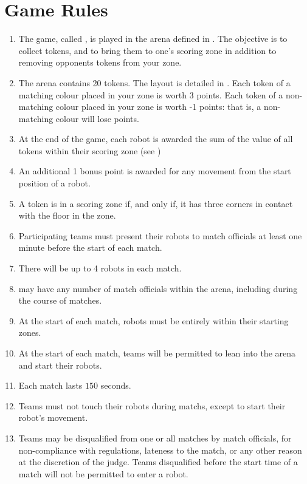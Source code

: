\section{Game Rules}
\label{sec:rules}

\begin{enumerate}
  \item The game, called \emph{\gamename}, is played in the arena defined in
        . The objective is to collect tokens, and to bring
        them to one's scoring zone in addition to removing opponents tokens from
        your zone.
  \item The arena contains 20 tokens. The layout is detailed in
        . Each token of a matching colour placed in your
        zone is worth 3 points. Each token of a non-matching colour placed in
        your zone is worth -1 points: that is, a non-matching colour will lose
        points.
  \item At the end of the game, each robot is awarded the sum of the value of
        all tokens within their scoring zone (see )
  \item An additional 1 bonus point is awarded for any movement from the
        start position of a robot.
  \item \label{rules:token}A token is in a scoring zone if, and only if, it
        has three corners in contact with the floor in the zone.
  \item Participating teams must present their robots to match officials at
        least one minute before the start of each match.
  \item There will be up to 4 robots in each match.
  \item \org may have any number of match officials within the arena, including
        during the course of matches.
  \item At the start of each match, robots must be entirely within their
        starting zones.
  \item At the start of each match, teams will be permitted to lean into the
        arena and start their robots.
  \item Each match lasts $150$ seconds.
  \item Teams must not touch their robots during matchs, except to start their
        robot's movement.
  \item Teams may be disqualified from one or all matches by match officials,
        for non-compliance with regulations, lateness to the match, or any other
        reason at the discretion of the judge. Teams disqualified before the
        start time of a match will not be permitted to enter a robot.
\end{enumerate}
